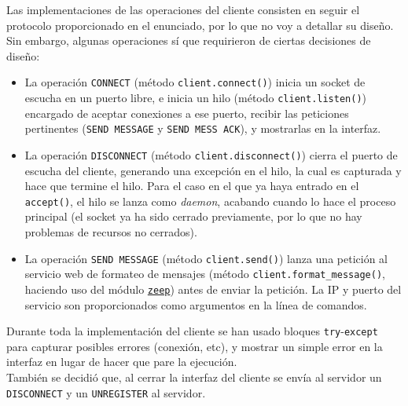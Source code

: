 Las implementaciones de las operaciones del cliente consisten en seguir el protocolo proporcionado en el enunciado, por lo que no voy a detallar su diseño.\\
Sin embargo, algunas operaciones sí que requirieron de ciertas decisiones de diseño:
\begin{itemize}
    \item La operación \texttt{CONNECT} (método \texttt{client.connect()}) inicia un socket de escucha en un puerto libre, e inicia un hilo (método \texttt{client.listen()}) encargado de aceptar conexiones a ese puerto, recibir las peticiones pertinentes (\texttt{SEND MESSAGE} y \texttt{SEND MESS ACK}), y mostrarlas en la interfaz.
    \item La operación \texttt{DISCONNECT} (método \texttt{client.disconnect()}) cierra el puerto de escucha del cliente, generando una excepción en el hilo, la cual es capturada y hace que termine el hilo. Para el caso en el que ya haya entrado en el \texttt{accept()}, el hilo se lanza como \textit{daemon}, acabando cuando lo hace el proceso principal (el socket ya ha sido cerrado previamente, por lo que no hay problemas de recursos no cerrados).
    \item La operación \texttt{SEND MESSAGE} (método \texttt{client.send()}) lanza una petición al servicio web de formateo de mensajes (método \texttt{client.format\_message()}, haciendo uso del módulo \href{https://pypi.org/project/zeep/}{\texttt{zeep}}) antes de enviar la petición. La IP y puerto del servicio son proporcionados como argumentos en la línea de comandos.
\end{itemize}

Durante toda la implementación del cliente se han usado bloques \texttt{try}-\texttt{except} para capturar posibles errores (conexión, etc), y mostrar un simple error en la interfaz en lugar de hacer que pare la ejecución.\\

También se decidió que, al cerrar la interfaz del cliente se envía al servidor un \texttt{DISCONNECT} y un \texttt{UNREGISTER} al servidor.